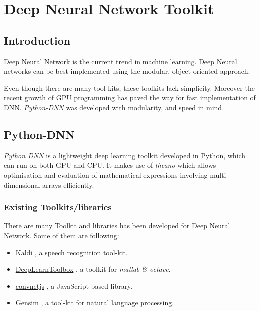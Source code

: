 \chapter{Deep Neural Network Toolkit} 
\label{chap:toolkit}
\section{Introduction}
Deep Neural Network is the current trend in machine learning. Deep Neural networks can be best implemented using the modular, object-oriented approach. 

Even though there are many tool-kits, these toolkits lack simplicity. Moreover the recent growth of GPU programming has paved the way for fast implementation of DNN. \textit{Python-DNN} was developed with modularity, and speed in mind.

\section{Python-DNN}
\textit{Python DNN} is a lightweight deep learning toolkit developed in Python, which can run on both GPU and CPU. It makes use of \emph{theano}  \cite{bergstra2010theano} which allows optimisation and evaluation of mathematical expressions involving multi-dimensional arrays efficiently.

\subsection{Existing Toolkits/libraries}
There are many Toolkit and libraries has been developed for Deep Neural Network. Some of them are following: 
\begin{itemize}
\item \href{http://kaldi.sourceforge.net/}{Kaldi} \citep{Povey_ASRU2011}, a speech recognition tool-kit.
\item \href{https://github.com/rasmusbergpalm/DeepLearnToolbox}{DeepLearnToolbox} \citep{IMM2012-06284}, a toolkit for \textit{matlab \& octave}.
\item \href{http://cs.stanford.edu/people/karpathy/convnetjs/}{convnetjs} \citep{convnetjs} , a JavaScript based library.
\item \href{https://radimrehurek.com/gensim}{Gensim} \citep{rehurek_lrec}, a tool-kit for natural language processing.
\end{itemize}

